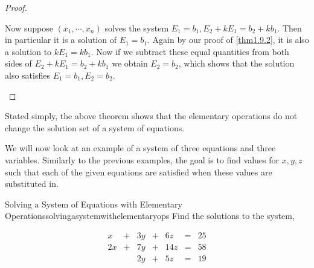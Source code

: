 \begin{proof}
\begin{enumerate}
Now suppose $\left( x_{1},\cdots ,x_{n}\right)$  solves the system 
$E_{1}=b_{1}, E_{2}+kE_{1}=b_{2}+kb_{1}$. Then in particular it is a solution of $E_{1} = b_{1}$. Again by our proof of \ref{thm1.9.2},
 it is also a solution to $kE_{1}=kb_{1}$. Now if we subtract these equal quantities from both sides of 
$E_{2}+kE_{1}=b_{2}+kb_{1}$ we obtain $E_{2}=b_{2}$, which shows that the solution also satisfies
$E_{1}=b_{1},E_{2}=b_{2}.$ 
\end{enumerate}
\end{proof}
\fi
Stated simply, the above theorem shows that the elementary operations do not
change the solution set of a system of equations.

We will now look at an example of a system of three equations and three variables.
Similarly to the previous examples, the goal is to find values for $x,y,z$ such that each of the given equations
are satisfied when these values are substituted in.

\begin{example}{ Solving a System of Equations with Elementary Operations}{solvingasystemwithelementaryops}
Find the solutions to the system,

\begin{equation}
\begin{array}{ccccccc}
x&+&3y&+&6z&=&25 \\
2x&+&7y&+&14z&=&58 \\
&&2y&+&5z&=&19
\end{array}
\label{solvingasystem1}
\end{equation}
\end{example}

